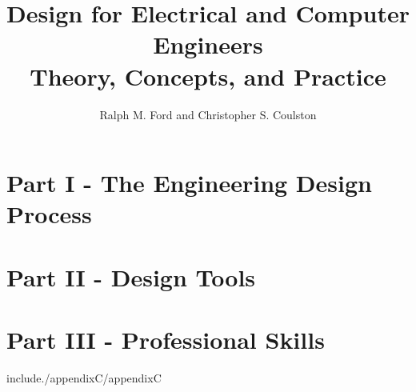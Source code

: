\documentclass[letterpaper, 10pt]{memoir}
\begin{document}
\frontmatter
\title{{\Huge Design for Electrical and Computer Engineers} \\
				Theory, Concepts, and Practice}
\author{Ralph M. Ford and Christopher S. Coulston}
\date{}
\maketitle





\tableofcontents


\mainmatter 					%

\chapter*{Part I - The Engineering Design Process }













\chapter*{Part II - Design Tools}













\chapter*{Part III - Professional Skills}












\appendix





include{./appendixC/appendixC}





\printindex
\end{document}
